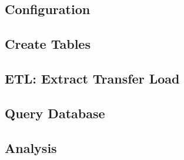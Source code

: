 \subsection{Configuration}


\subsection{Create Tables}






\subsection{ETL: Extract Transfer Load}





\subsection{Query Database}





\subsection{Analysis}



